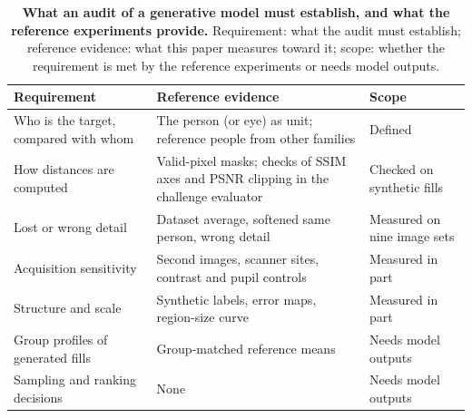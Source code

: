 \begin{table}[t]
\centering
\caption{\textbf{What an audit of a generative model must establish, and what the reference experiments provide.}
Requirement: what the audit must establish; reference evidence: what this paper measures toward it; scope: whether the requirement is met by the reference experiments or needs model outputs.}
\label{tab:decision}
\small
\begin{tabular}{@{}p{}p{}p{}@{}}
\toprule
Requirement & Reference evidence & Scope \\
\midrule
Who is the target, compared with whom & The person (or eye) as unit; reference people from other families & Defined \\
How distances are computed & Valid-pixel masks; checks of SSIM axes and PSNR clipping in the challenge evaluator & Checked on synthetic fills \\
Lost or wrong detail & Dataset average, softened same person, wrong detail & Measured on nine image sets \\
Acquisition sensitivity & Second images, scanner sites, contrast and pupil controls & Measured in part \\
Structure and scale & Synthetic labels, error maps, region-size curve & Measured in part \\
Group profiles of generated fills & Group-matched reference means & Needs model outputs \\
Sampling and ranking decisions & None & Needs model outputs \\
\bottomrule
\end{tabular}
\end{table}
